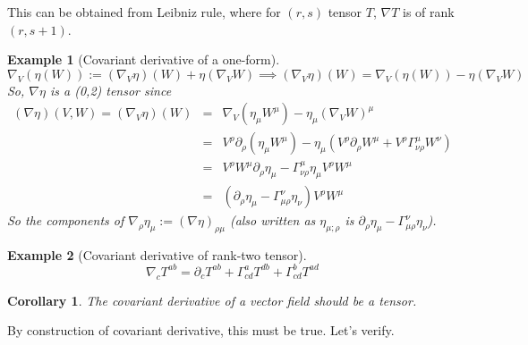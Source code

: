 \documentclass[a4paper]{article}
\newtheorem{eg}{Example}[section]
\theoremstyle{new}
\newtheorem{cor}{Corollary}[section]
\begin{document}
This can be obtained from Leibniz rule, where for $(r,s)$ tensor $T$, $\nabla T$ is of rank $(r,s+1)$.
\begin{eg}[Covariant derivative of a one-form]
$$\nabla_V(\eta(W)):=(\nabla_V\eta)(W)+\eta(\nabla_VW)\implies (\nabla_V\eta)(W)=\nabla_V(\eta(W))-\eta(\nabla_VW)$$
So, $\nabla\eta$ is a (0,2) tensor since
\begin{eqnarray}
(\nabla\eta)(V,W)=(\nabla_V\eta)(W)&=&\nabla_V(\eta_\mu W^\mu)-\eta_\mu(\nabla_VW)^\mu\nonumber\\&=&V^\rho\partial_\rho(\eta_\mu W^\mu)-\eta_\mu(V^\rho\partial_\rho W^\mu+V^\rho\Gamma_{\nu\rho}^\mu W^\nu)\nonumber\\&=&V^\rho W^\mu\partial_\rho\eta_\mu-\Gamma_{\nu\rho}^\mu\eta_\mu V^\rho W^\mu\nonumber\\&=&(\partial_\rho\eta_\mu-\Gamma_{\mu\rho}^\nu\eta_\nu)V^\rho W^\mu\nonumber
\end{eqnarray}
So the components of $\nabla_\rho\eta_\mu:=(\nabla\eta)_{\rho\mu}$ (also written as $\eta_{\mu;\rho}$ is $\partial_\rho\eta_\mu-\Gamma_{\mu\rho}^\nu\eta_\nu$).
\end{eg}
\begin{eg}[Covariant derivative of rank-two tensor]
$$\nabla_cT^{ab}=\partial_cT^{ab}+\Gamma^a_{cd}T^{db}+\Gamma^b_{cd}T^{ad}$$
\end{eg}
\begin{cor}
The covariant derivative of a vector field should be a tensor.
\end{cor}
By construction of covariant derivative, this must be true. Let's verify.
\end{document}
